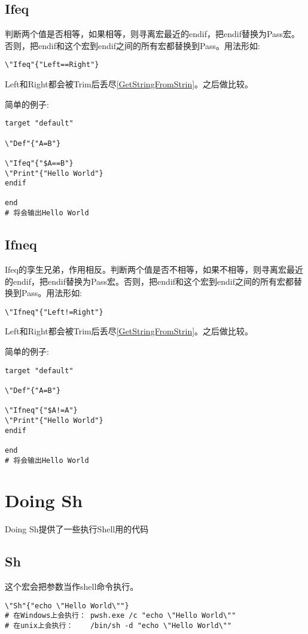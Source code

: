 \subsection{Ifeq}
判断两个值是否相等，如果相等，则寻离宏最近的endif，把endif替换为Pass宏。否则，把endif和这个宏到endif之间的所有宏都替换到Pass。用法形如:
\begin{lstlisting}
\"Ifeq"{"Left==Right"}
\end{lstlisting}
Left和Right都会被Trim后丢尽\ref{GetStringFromStrin}。之后做比较。

简单的例子:
\begin{lstlisting}
target "default"

\"Def"{"A=B"}

\"Ifeq"{"$A==B"}
\"Print"{"Hello World"}
endif

end
# 将会输出Hello World
\end{lstlisting}

\subsection{Ifneq}
Ifeq的孪生兄弟，作用相反。判断两个值是否不相等，如果不相等，则寻离宏最近的endif，把endif替换为Pass宏。否则，把endif和这个宏到endif之间的所有宏都替换到Pass。用法形如:
\begin{lstlisting}
\"Ifneq"{"Left!=Right"}
\end{lstlisting}
Left和Right都会被Trim后丢尽\ref{GetStringFromStrin}。之后做比较。

简单的例子:
\begin{lstlisting}
target "default"
	
\"Def"{"A=B"}
	
\"Ifneq"{"$A!=A"}
\"Print"{"Hello World"}
endif
	
end
# 将会输出Hello World
\end{lstlisting}


\section{Doing Sh}
Doing Sh提供了一些执行Shell用的代码

\subsection{Sh}
这个宏会把参数当作shell命令执行。
\begin{lstlisting}
\"Sh"{"echo \"Hello World\""}
# 在Windows上会执行：	pwsh.exe /c "echo \"Hello World\""
# 在unix上会执行：	/bin/sh -d "echo \"Hello World\""
\end{lstlisting}


